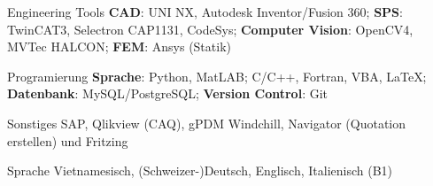 

\begin{cvskills}


  \cvskill
    {Engineering Tools} %
    {\textbf{CAD}: UNI NX, Autodesk Inventor/Fusion 360; 
    \newline \textbf{SPS}: TwinCAT3, Selectron CAP1131, CodeSys;
    \newline \textbf{Computer Vision}: OpenCV4, MVTec HALCON;
	\newline \textbf{FEM}: Ansys (Statik)} %

%

  \cvskill
    {Programierung} %
    {\textbf{Sprache}: Python, MatLAB; C/C++, Fortran, VBA, LaTeX; 
    	\newline \textbf{Datenbank}: MySQL/PostgreSQL;
    	\newline \textbf{Version Control}: Git
    	} %

  \cvskill
    {Sonstiges} %
    {SAP, Qlikview (CAQ), gPDM Windchill, Navigator (Quotation erstellen) und Fritzing} %

  \cvskill
    {Sprache} %
    {Vietnamesisch, (Schweizer-)Deutsch, Englisch, Italienisch (B1)} %

\end{cvskills}
